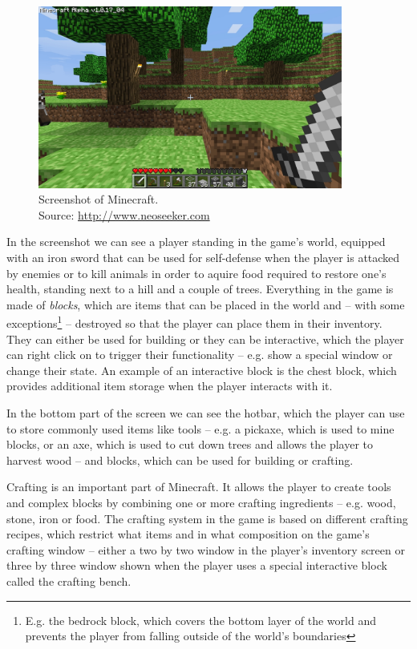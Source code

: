 \begin{figure}[H]
    \centering
    \includegraphics[width=10cm]{../img/minecraft.jpg}
    \caption{Screenshot of Minecraft.
             \\Source: \href{http://i.neoseeker.com/p/Games/PC/Simulation/City/minecraft\_image\_zx2AU2n6bZho0lz.jpg}{http://www.neoseeker.com}}
    \label{minecraft}
\end{figure}

In the screenshot we can see a player standing in the game's world, equipped with an iron sword that can be used for self-defense when the
player is attacked by enemies or to kill animals in order to aquire food required to restore one's health, standing next to a hill and
a couple of trees. Everything in the game is made of \emph{blocks}, which are items that can be placed in the world and
-- with some exceptions\footnote{E.g. the bedrock block, which covers
the bottom layer of the world and prevents the player from falling outside of the world's boundaries} -- destroyed so that the player
can place them in their inventory. They can either be used for building or they can be interactive, which the player can right click on
to trigger their functionality -- e.g. show a special window or change their state. An example of an interactive block is the chest block,
which provides additional item storage when the player interacts with it.

In the bottom part of the screen we can see the hotbar, which the player can use to store commonly used items 
like tools -- e.g. a pickaxe, which is used to mine blocks,
or an axe, which is used to cut down trees and allows the player to harvest wood -- and blocks, which can be used for building or
crafting.

Crafting is an important part of Minecraft. It allows the player to create tools and complex blocks by combining one or more crafting
ingredients -- e.g. wood, stone, iron or food. The crafting system in the game is based on different crafting recipes, which restrict
what items and in what composition on the game's crafting window -- either a two by two window in the player's inventory screen
or three by three window shown when the player uses a special interactive block called the crafting bench.

